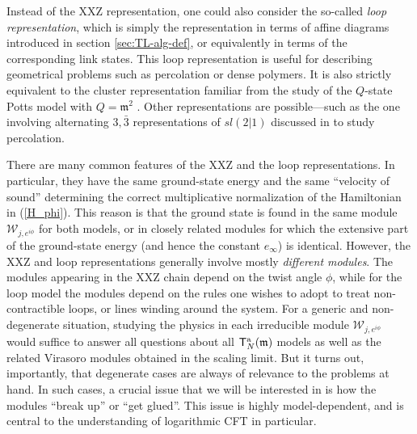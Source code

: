 \documentclass[a4paper,10pt]{article}
\newcommand{\linnea}[1]{$\framebox{\tiny L}$\ \textbf{\texttt{{\color{red}\footnotesize#1}}}}
\newcommand{\aSt}{\mathcal{W}}
\newcommand{\AStTL}[2]{\aSt_{#1,#2}}
\newcommand{\ATL}[1]{\mathsf{T}^{\rm a}_{#1}}
\newcommand{\m}{\mathfrak{m}}
\begin{document}

Instead of the XXZ representation, one could also consider the so-called {\em loop representation}, which is simply the representation in terms of affine diagrams introduced in section \ref{sec:TL-alg-def}, or equivalently in terms of the corresponding link states.
%
This loop representation is useful for describing geometrical problems such as percolation or dense polymers. It is also strictly equivalent to the cluster representation familiar from the study of the $Q$-state Potts model with $Q=\m^2$ \cite{JacobsenSaleur}. Other representations are possible---such as the one involving alternating $3,\bar{3}$ representations of $sl(2|1)$ discussed in \cite{GRSV} to study percolation. 




There are many common features of the XXZ and the loop representations. In particular, they have the same ground-state energy and the same ``velocity of sound'' determining the correct multiplicative normalization of the Hamiltonian in (\ref{H_phi}). This reason is that the ground state is found in the same module $\AStTL{j}{e^{i\phi}}$ for both models, or in closely related modules for which the extensive part of the ground-state energy  (and hence the constant $e_\infty$) is identical. However, the XXZ and loop representations generally involve mostly {\sl different modules}. The modules appearing in the XXZ chain depend on the twist angle $\phi$, while for the loop model the modules depend on the rules one wishes to adopt to treat non-contractible loops, or lines winding around the system. For a generic and non-degenerate situation, studying the physics in each irreducible module $\AStTL{j}{e^{i\phi}}$ would suffice to answer all questions about all $\ATL{N}(\m)$ models as well as the related Virasoro modules obtained in the scaling limit. But it turns out, importantly, that degenerate cases are always of relevance to the problems at hand. In such cases, a crucial issue that we will be interested in is how the modules ``break up'' or ``get glued''. This issue is highly model-dependent, and is central to the understanding of logarithmic CFT in particular.

\end{document}

